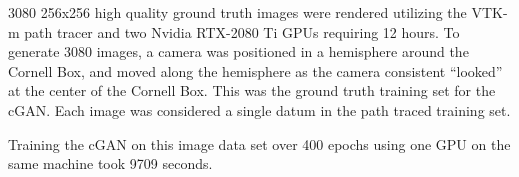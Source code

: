 3080 256x256 high quality ground truth images were rendered utilizing the VTK-m path tracer and two Nvidia RTX-2080 Ti GPUs requiring 12 hours. To generate 3080 images, a camera was positioned in a hemisphere around the Cornell Box, and moved along the hemisphere as the camera consistent ``looked'' at the center of the Cornell Box. This was the ground truth training set for the cGAN. Each image was considered a single datum in the path traced training set.


Training the cGAN on this image data set over 400 epochs using one GPU on the same machine took 9709 seconds. %



